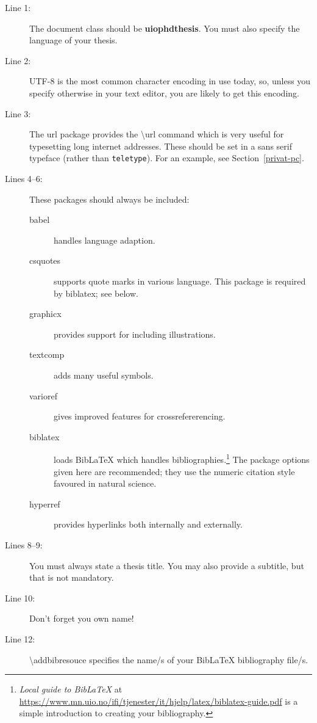 \documentclass[UKenglish]{uiophdthesis}
\newcommand{\bsl}{\textbackslash}
\newcommand{\p}[1]{\textsf{#1}}
\newcommand{\pb}[1]{\textbf{\p{#1}}}
\newcommand{\pcmd}[1]{\p{\bsl #1}}
\begin{document}
\begin{description}
\item[Line 1:] The document class should be \pb{uiophdthesis}. You must
  also specify the language of your thesis.
\item[Line 2:] UTF-8 is the most common character encoding in use
  today, so, unless you specify otherwise in your text editor, you are
  likely to get this encoding.
\item[Line 3:] The \p{url} package provides the \pcmd{url}
  command which is very useful for typesetting long internet
  addresses. These should be set in a \textsf{sans serif} typeface
  (rather than \texttt{teletype}). For an example, see
  Section~\vref{privat-pc}.
\item[Lines 4--6:] These packages should always be included:
  \begin{description}
  \item[\p{babel}] handles language adaption.
  \item[\p{csquotes}] supports quote marks in various language. This
    package is required by \p{biblatex}; see below.
  \item[\p{graphicx}] provides support for including illustrations.
  \item[\p{textcomp}] adds many useful symbols.
  \item[\p{varioref}] gives improved features for crossrefererencing.
  \item[\p{biblatex}] loads Bib\LaTeX{} which handles
    bibliographies.\footnote{\emph{Local guide to Bib\LaTeX} at
      \url{https://www.mn.uio.no/ifi/tjenester/it/hjelp/latex/biblatex-guide.pdf}
      is a simple introduction to creating your bibliography.}
    The package options given here are recommended; they use the
    numeric citation style favoured in natural science.
  \item[\p{hyperref}] provides hyperlinks both internally and externally.
  \end{description}

\item[Lines 8--9:] You must always state a thesis title. You may also
  provide a subtitle, but that is not mandatory.
\item[Line 10:] Don't forget you own name!

\item [Line 12:] \pcmd{addbibresouce} specifies the name/s of your Bib\LaTeX{}
  bibliography file/s.


\end{description}
\end{document}
